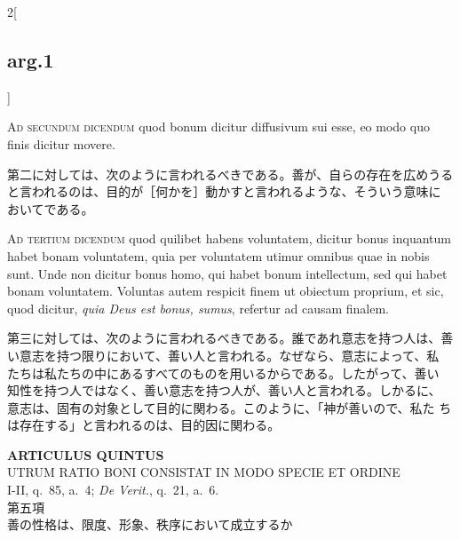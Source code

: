 \documentclass[paper=a4paper,fontsize=10pt,jafontsize=9pt,titlepage]{jlreq}
\begin{document}
\begin{paracol}{2}[\subsection{arg.1}]
\switchcolumn*[\subsection{ad.2}]

{\scshape Ad secundum dicendum} quod bonum dicitur diffusivum sui esse, eo
 modo quo finis dicitur movere.

\switchcolumn

第二に対しては、次のように言われるべきである。善が、自らの存在を広めうる
 と言われるのは、目的が［何かを］動かすと言われるような、そういう意味に
 おいてである。

\switchcolumn*[\subsection{ad.3}]

{\scshape Ad tertium dicendum} quod quilibet habens voluntatem, dicitur
 bonus inquantum habet bonam voluntatem, quia per voluntatem utimur
 omnibus quae in nobis sunt. Unde non dicitur bonus homo, qui habet
 bonum intellectum, sed qui habet bonam voluntatem. Voluntas autem
 respicit finem ut obiectum proprium, et sic, quod dicitur, {\itshape
 quia Deus est bonus, sumus}, refertur ad causam finalem.

\switchcolumn

第三に対しては、次のように言われるべきである。誰であれ意志を持つ人は、善
 い意志を持つ限りにおいて、善い人と言われる。なぜなら、意志によって、私
 たちは私たちの中にあるすべてのものを用いるからである。したがって、善い
 知性を持つ人ではなく、善い意志を持つ人が、善い人と言われる。しかるに、
 意志は、固有の対象として目的に関わる。このように、「神が善いので、私た
 ちは存在する」と言われるのは、目的因に関わる。

\end{paracol}
\newpage
{}
{}
\setcounter{section}{5}
\setcounter{subsection}{0}
 
\begin{center}
 {\Large {\bfseries ARTICULUS QUINTUS}}\\
 {\large UTRUM RATIO BONI CONSISTAT IN MODO SPECIE ET ORDINE}\\
 {\footnotesize I-II, q.~85, a.~4; {\itshape De Verit.}, q.~21, a.~6.}\\
 {\Large 第五項\\善の性格は、限度、形象、秩序において成立するか}
\end{center}
\end{document}
